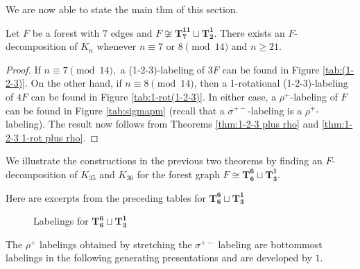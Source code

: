 We are now able to state the main thm of this section.
\begin{thm}\label{thm:7 or 8 mod 14}
    Let $F$ be a forest with $7$ edges and $F \not \cong \mathbf{T_{7}^{11}}\sqcup\mathbf{T_{2}^{1}}$. There exists an $F$-decomposition of $K_n$ whenever $n \equiv 7 \textrm{ or } 8 \pmod{14}$ and $n \geq 21.$
\end{thm}
\begin{proof}
    If $n \equiv 7 \pmod{14},$ a (1-2-3)-labeling of $3F$ can be found in Figure \ref{tab:(1-2-3)}. On the other hand, if $n \equiv 8 \pmod{14}$, then a 1-rotational (1-2-3)-labeling of $4F$ can be found in Figure \ref{tab:1-rot(1-2-3)}. In either case, a $\rho^{+}$-labeling of $F$ can be found in Figure \ref{tab:sigmapm} (recall that a $\sigma^{+-}$-labeling is a $\rho^{+}$-labeling). The result now follows from Theorems \ref{thm:1-2-3 plus rho} and \ref{thm:1-2-3 1-rot plus rho}.
\end{proof}
\begin{example}
We illustrate the constructions in the previous two theorems by finding an $F$-decomposition of $K_{35}$ and $K_{36}$ for the forest graph $F \cong \mathbf{T_{6}^{6}} \sqcup \mathbf{T_{3}^{1}}$.\newline

\noindent Here are excerpts from the preceding tables for $\mathbf{T_{6}^{6}} \sqcup \mathbf{T_{3}^{1}}$

\begin{figure}[H]
\centering
        \scalebox{0.6}{}
        \caption{Labelings for $\mathbf{T_{6}^{6}} \sqcup \mathbf{T_{3}^{1}}$}
        \label{fig:example chart}
\end{figure}

The $\rho^{+}$ labelings obtained by stretching the $\sigma^{+-}$ labeling are bottommost labelings in the following generating presentations and are developed by $1$.
\end{example}

        
        
